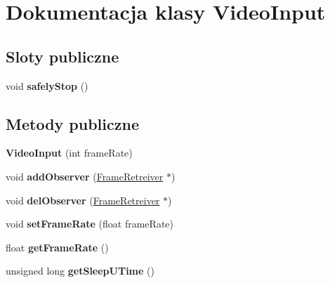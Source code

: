 \hypertarget{class_video_input}{
\section{Dokumentacja klasy VideoInput}
\label{class_video_input}
}
\subsection*{Sloty publiczne}
\begin{DoxyCompactItemize}
\item 
\hypertarget{class_video_input_a78e2d773100160be101d3c48ecdfb910}{
void {\bfseries safelyStop} ()}
\label{class_video_input_a78e2d773100160be101d3c48ecdfb910}

\end{DoxyCompactItemize}
\subsection*{Metody publiczne}
\begin{DoxyCompactItemize}
\item 
\hypertarget{class_video_input_a136409a2c510d131dd25b00796ebb9a6}{
{\bfseries VideoInput} (int frameRate)}
\label{class_video_input_a136409a2c510d131dd25b00796ebb9a6}

\item 
\hypertarget{class_video_input_ac2370a0c1ea0d4b1ce36c2f9678530a4}{
void {\bfseries addObserver} (\hyperlink{class_frame_retreiver}{FrameRetreiver} $\ast$)}
\label{class_video_input_ac2370a0c1ea0d4b1ce36c2f9678530a4}

\item 
\hypertarget{class_video_input_afc3bab19893d3e49284ab8b8101b9d1f}{
void {\bfseries delObserver} (\hyperlink{class_frame_retreiver}{FrameRetreiver} $\ast$)}
\label{class_video_input_afc3bab19893d3e49284ab8b8101b9d1f}

\item 
\hypertarget{class_video_input_a498cc39dce8940616e9d1811953bf920}{
void {\bfseries setFrameRate} (float frameRate)}
\label{class_video_input_a498cc39dce8940616e9d1811953bf920}

\item 
\hypertarget{class_video_input_aa172de34ebd4e1f1e7c63548fb406f39}{
float {\bfseries getFrameRate} ()}
\label{class_video_input_aa172de34ebd4e1f1e7c63548fb406f39}

\item 
\hypertarget{class_video_input_a95deb1fbd0ab027a4208b7432dedcdc9}{
unsigned long {\bfseries getSleepUTime} ()}
\label{class_video_input_a95deb1fbd0ab027a4208b7432dedcdc9}

\end{DoxyCompactItemize}
